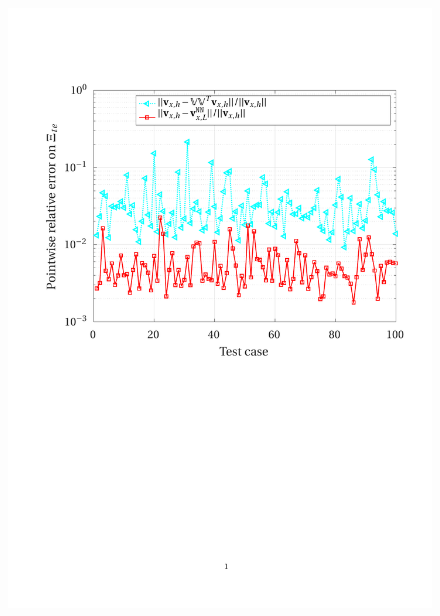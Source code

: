 \documentclass[12pt, a4paper, twoside, openright]{report}
\numberwithin{equation}{chapter}
\theoremstyle{theorem}
\theoremstyle{definition}
\theoremstyle{remark}
\theoremstyle{proposition}
\numberwithin{figure}{chapter}
\begin{document}
	\begin{figure}[H]
		\center
		\includegraphics[scale = 0.75, trim = {1.5cm 12cm 1cm 3.5cm}, clip]{dc_400_vx_pointwise_error_nn_bis}
	\end{figure}
	
\end{document}
